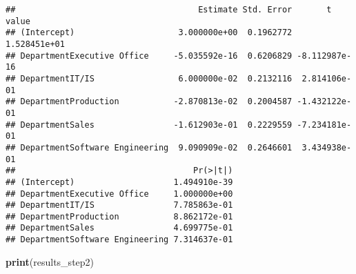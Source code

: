 \documentclass[
]{article}
\newenvironment{Shaded}{\begin{snugshade}}{\end{snugshade}}
\newcommand{\DocumentationTok}[1]{\textcolor[rgb]{0.56,0.35,0.01}{\textbf{\textit{#1}}}}
\newcommand{\FunctionTok}[1]{\textcolor[rgb]{0.13,0.29,0.53}{\textbf{#1}}}
\newcommand{\NormalTok}[1]{#1}
\newcommand{\OtherTok}[1]{\textcolor[rgb]{0.56,0.35,0.01}{#1}}
\newcommand{\SpecialCharTok}[1]{\textcolor[rgb]{0.81,0.36,0.00}{\textbf{#1}}}
\newcommand{\StringTok}[1]{\textcolor[rgb]{0.31,0.60,0.02}{#1}}
\begin{document}
\begin{Shaded}
\end{Shaded}

\begin{verbatim}
##                                     Estimate Std. Error       t value
## (Intercept)                     3.000000e+00  0.1962772  1.528451e+01
## DepartmentExecutive Office     -5.035592e-16  0.6206829 -8.112987e-16
## DepartmentIT/IS                 6.000000e-02  0.2132116  2.814106e-01
## DepartmentProduction           -2.870813e-02  0.2004587 -1.432122e-01
## DepartmentSales                -1.612903e-01  0.2229559 -7.234181e-01
## DepartmentSoftware Engineering  9.090909e-02  0.2646601  3.434938e-01
##                                    Pr(>|t|)
## (Intercept)                    1.494910e-39
## DepartmentExecutive Office     1.000000e+00
## DepartmentIT/IS                7.785863e-01
## DepartmentProduction           8.862172e-01
## DepartmentSales                4.699775e-01
## DepartmentSoftware Engineering 7.314637e-01
\end{verbatim}

\begin{Shaded}
\begin{Highlighting}[]
\FunctionTok{print}\NormalTok{(results\_step2)}
\end{Highlighting}
\end{Shaded}
\end{document}
